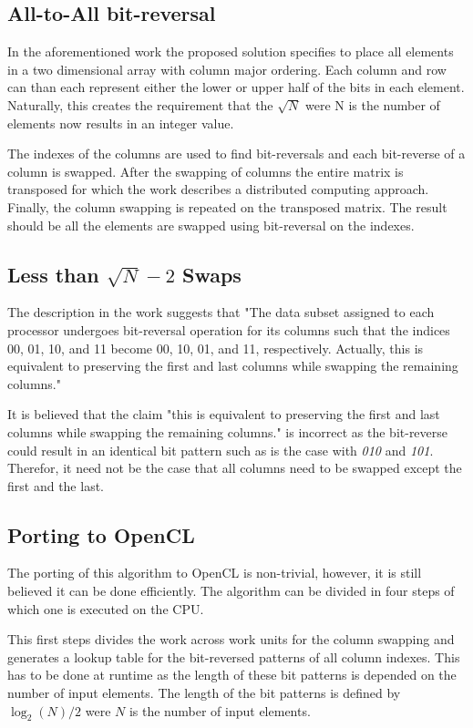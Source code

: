 \documentclass[conference]{IEEEtran}
\begin{document}
\subsection{All-to-All bit-reversal}

In the aforementioned work the proposed solution specifies to place all
elements in a two dimensional array with column major ordering. Each column
and row can than each represent either the lower or upper half of the bits in
each element. Naturally, this creates the requirement that the $\sqrt{N}$ were
N is the number of elements now results in an integer value.

The indexes of the columns are used to find bit-reversals and each bit-reverse
of a column is swapped. After the swapping of columns the entire matrix is
transposed for which the work describes a distributed computing approach.
Finally, the column swapping is repeated on the transposed matrix. The result
should be all the elements are swapped using bit-reversal on the indexes.

\subsection{Less than $\sqrt{N}-2$ Swaps}

The description in the work suggests that "The data subset assigned to each
processor undergoes bit-reversal operation for its columns such that the indices
00, 01, 10, and 11 become 00, 10, 01, and 11, respectively. Actually, this is
equivalent to preserving the first and last columns while swapping the
remaining columns."

It is believed that the claim "this is equivalent to preserving the first and
last columns while swapping the remaining columns." is incorrect as the
bit-reverse could result in an identical bit pattern such as is the case with
\textit{010} and \textit{101}. Therefor, it need not be the case that all
columns need to be swapped except the first and the last.

\subsection{Porting to OpenCL}

The porting of this algorithm to OpenCL is non-trivial, however, it is still
believed it can be done efficiently. The algorithm can be divided in four
steps of which one is executed on the CPU.

This first steps divides the work across work units for the column swapping
and generates a lookup table for the bit-reversed patterns of all column
indexes. This has to be done at runtime as the length of these bit patterns is
depended on the number of input elements. The length of the bit patterns is
defined by $\log_2(N)/2$ were $N$ is the number of input elements.
\end{document}
